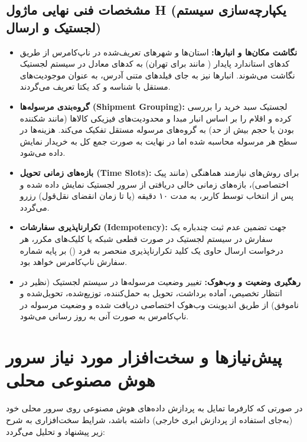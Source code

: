 \documentclass[11pt,a4paper]{article}
\begin{document}
\subsection{مشخصات فنی نهایی ماژول H (یکپارچه‌سازی سیستم لجستیک و ارسال)}
\begin{itemize}
    \item \textbf{نگاشت مکان‌ها و انبارها:} استان‌ها و شهرهای تعریف‌شده در ناپ‌کامرس از طریق کدهای استاندارد پایدار ( مانند  برای تهران) به کدهای معادل در سیستم لجستیک نگاشت می‌شوند. انبارها نیز به جای فیلدهای متنی آدرس، به عنوان موجودیت‌های مستقل با شناسه و کد یکتا تعریف می‌گردند.
    \item \textbf{گروه‌بندی مرسوله‌ها (Shipment Grouping):} لجستیک سبد خرید را بررسی کرده و اقلام را بر اساس انبار مبدا و محدودیت‌های فیزیکی کالاها (مانند شکننده بودن یا حجم بیش از حد) به گروه‌های مرسوله مستقل تفکیک می‌کند. هزینه‌ها در سطح هر مرسوله محاسبه شده اما در نهایت به صورت جمع کل به خریدار نمایش داده می‌شود.
    \item \textbf{بازه‌های زمانی تحویل (Time Slots):} برای روش‌های نیازمند هماهنگی (مانند پیک اختصاصی)، بازه‌های زمانی خالی دریافتی از سرور لجستیک نمایش داده شده و پس از انتخاب توسط کاربر، به مدت ۱۰ دقیقه (یا تا زمان انقضای نقل‌قول) رزرو می‌گردد.
    \item \textbf{تکرارناپذیری سفارشات (Idempotency):} جهت تضمین عدم ثبت چندباره یک سفارش در سیستم لجستیک در صورت قطعی شبکه یا کلیک‌های مکرر، هر درخواست ارسال حاوی یک کلید تکرارناپذیری منحصر به فرد () بر پایه شماره سفارش ناپ‌کامرس خواهد بود.
    \item \textbf{رهگیری وضعیت و وب‌هوک:} تغییر وضعیت مرسوله‌ها در سیستم لجستیک (نظیر در انتظار تخصیص، آماده برداشت، تحویل به حمل‌کننده، توزیع‌شده، تحویل‌شده و ناموفق) از طریق اندپوینت وب‌هوک اختصاصی دریافت شده و وضعیت مرسوله در ناپ‌کامرس به صورت آنی به روز رسانی می‌شود.
\end{itemize}

\newpage
\section{پیش‌نیازها و سخت‌افزار مورد نیاز سرور هوش مصنوعی محلی}
در صورتی که کارفرما تمایل به پردازش داده‌های هوش مصنوعی روی سرور محلی خود (به‌جای استفاده از پردازش ابری خارجی) داشته باشد، شرایط سخت‌افزاری به شرح زیر پیشنهاد و تحلیل می‌گردد:
\end{document}
